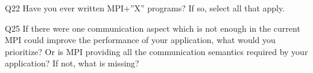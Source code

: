 \begin{description}%
\item{Q22} Have you ever written MPI+”X” programs? If so, select all that apply.%
\item{Q25} If there were one communication aspect which is not enough in the current MPI could improve the performance of your application, what would you prioritize? Or is MPI providing all the communication semantics required by your application? If not, what is missing?%
\end{description}%
